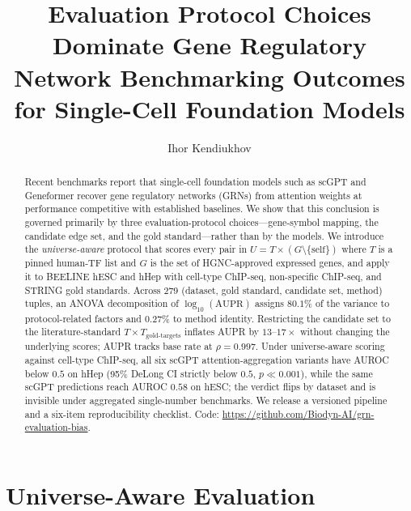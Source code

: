 \documentclass[sigconf, nonacm]{acmart}
\begin{document}
\title[Protocol Choices Dominate GRN Benchmarking]{Evaluation Protocol Choices Dominate Gene Regulatory Network Benchmarking Outcomes for Single-Cell Foundation Models}

\author{Ihor Kendiukhov}
\renewcommand{\shortauthors}{Kendiukhov}

\begin{abstract}
Recent benchmarks report that single-cell foundation models such as scGPT
and Geneformer recover gene regulatory networks (GRNs) from attention
weights at performance competitive with established baselines. We show
that this conclusion is governed primarily by three evaluation-protocol
choices---gene-symbol mapping, the candidate edge set, and the gold
standard---rather than by the models. We introduce the
\emph{universe-aware} protocol that scores every pair in
$U = T \times (G \setminus \{\text{self}\})$ where $T$ is a pinned
human-TF list and $G$ is the set of HGNC-approved expressed genes, and
apply it to BEELINE hESC and hHep with cell-type ChIP-seq,
non-specific ChIP-seq, and STRING gold standards. Across 279 (dataset,
gold standard, candidate set, method) tuples, an ANOVA decomposition of
$\log_{10}(\text{AUPR})$ assigns $80.1\%$ of the variance to
protocol-related factors and $0.27\%$ to method identity. Restricting
the candidate set to the literature-standard
$T \times T_{\text{gold-targets}}$ inflates AUPR by $13\text{--}17\times$
without changing the underlying scores; AUPR tracks base rate at
$\rho = 0.997$. Under universe-aware scoring against cell-type ChIP-seq,
all six scGPT attention-aggregation variants have AUROC below $0.5$ on
hHep (95\% DeLong CI strictly below $0.5$, $p \ll 0.001$), while the
same scGPT predictions reach AUROC $0.58$ on hESC; the verdict flips by
dataset and is invisible under aggregated single-number benchmarks. We
release a versioned pipeline and a six-item reproducibility checklist.
Code: \url{https://github.com/Biodyn-AI/grn-evaluation-bias}.
\end{abstract}


\maketitle

\section{Universe-Aware Evaluation}
\end{document}
